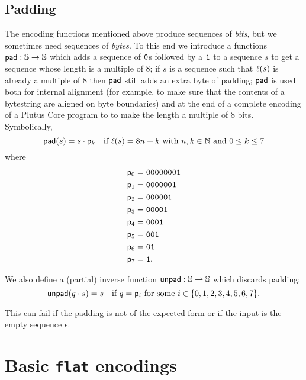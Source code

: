 \subsection{Padding}
The encoding functions mentioned above produce sequences of \textit{bits}, but
we sometimes need sequences of \textit{bytes}.  To this end we introduce a
functions $\mathsf{pad}: \mathbb{S} \rightarrow \mathbb{S}$ which adds a sequence of $\mathtt{0}$s
followed by a $\mathtt{1}$ to a sequence $s$ to get a sequence whose length is a
multiple of 8; if $s$ is a sequence such that $\operatorname{\ell}(s)$ is already a multiple of 8
then $\mathsf{pad}$ still adds an extra byte of padding; $\mathsf{pad}$ is used both for
internal alignment (for example, to make sure that the contents of a bytestring
are aligned on byte boundaries) and at the end of a complete encoding of a
Plutus Core program to to make the length a multiple of 8 bits.
Symbolically, 
$$
\mathsf{pad}(s)  = s \cdot \mathsf{p}_{k} \quad \text{if $\operatorname{\ell}(s) = 8n+k$ with $n,k \in \mathbb{N}$ and $0 \leq k \leq 7$}
$$
where
\begin{align*}
 \mathsf{p}_{0} &= \mathtt{00000001} \\
 \mathsf{p}_{1} &= \mathtt{0000001}  \\
 \mathsf{p}_{2} &= \mathtt{000001}   \\
 \mathsf{p}_{3} &= \mathtt{00001}    \\
 \mathsf{p}_{4} &= \mathtt{0001}     \\
 \mathsf{p}_{5} &= \mathtt{001}      \\
 \mathsf{p}_{6} &= \mathtt{01}       \\
 \mathsf{p}_{7} &= \mathtt{1}.
 \end{align*}

\noindent We also define a (partial) inverse function $\mathsf{unpad}: \mathbb{S} \rightharpoonup
\mathbb{S}$ which discards padding:
$$
  \mathsf{unpad}(q \cdot s) = s \quad \text{if $q = \mathsf{p}_{i}$ for some $i \in \{0,1,2,3,4,5,6,7\} $}.
$$

\noindent This can fail if the padding is not of the expected form or if the input is
the empty sequence $\epsilon$.

\section{Basic \texttt{flat} encodings}
\label{sec:basic-flat-encodings}
